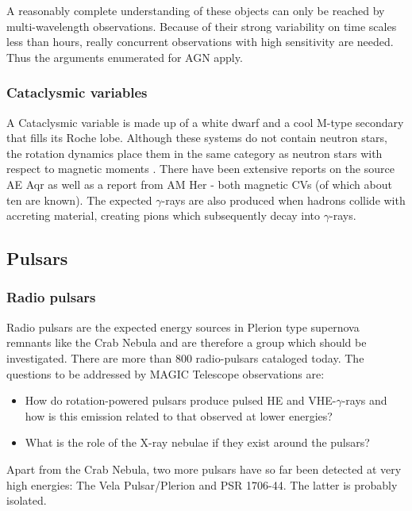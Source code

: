 A reasonably complete understanding of these objects can only be reached by
multi-wavelength observations. Because of their strong variability on
time scales less than hours, really concurrent observations with high
sensitivity are needed. Thus the arguments enumerated for AGN apply.

\subsubsection{Cataclysmic variables}

\medskip A Cataclysmic variable is
made up of a white dwarf and a cool M-type secondary that
fills its Roche lobe. Although these systems do not contain neutron stars,
the rotation dynamics place them in the same category as neutron stars with
respect to magnetic moments \cite{meintjes:94}. There have been
extensive reports on the source AE Aqr as well as a report from AM Her -
both magnetic CVs (of which about ten are known). The expected $\gamma$-rays
are also produced when hadrons collide with accreting material, creating
pions which subsequently decay into $\gamma$-rays.

\subsection{Pulsars}

\subsubsection{Radio pulsars}

\medskip Radio pulsars are the expected energy sources in Plerion type supernova
remnants like the Crab Nebula and are therefore a group which should be
investigated. There are more than 800 radio-pulsars cataloged today. The
questions to be addressed by MAGIC Telescope observations are:

\begin{itemize}
\item  How do rotation-powered pulsars produce pulsed HE and VHE-$\gamma $-rays and
how is this emission related to that observed at lower energies?

\item  What is the role of the X-ray nebulae if they exist around the
pulsars?
\end{itemize}

Apart from the Crab Nebula, two more pulsars have so far been detected at
very high energies: The Vela Pulsar/Plerion and PSR 1706-44. The latter is
probably isolated.

